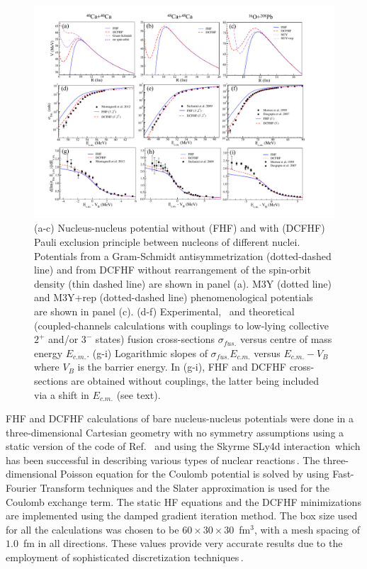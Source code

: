 \begin{figure}
	\includegraphics*[width=\textwidth]{../Figures/Pauli/Vb_cs.pdf}
	\caption{ (a-c) Nucleus-nucleus potential without (FHF) and with (DCFHF) 
		Pauli exclusion principle between nucleons of different nuclei. Potentials  from a 
		Gram-Schmidt antisymmetrization (dotted-dashed line) and from DCFHF without 
		rearrangement of the spin-orbit density (thin dashed line) are  shown in panel (a). 
		M3Y (dotted line) and M3Y+rep (dotted-dashed line) phenomenological potentials~\protect\citep{esbensen2007}  are shown in panel (c). (d-f) 
		Experimental,~\protect\citep{morton1999,dasgupta2007,montagnoli2012,stefanini2009} and theoretical 
		(coupled-channels calculations with couplings to low-lying collective $2^+$ and/or 
		$3^-$ states) fusion cross-sections $\sigma_{fus.}$ versus centre of mass energy 
		$E_{c.m.}$. (g-i)  Logarithmic slopes of $\sigma_{fus.}E_{c.m.}$ versus $E_{c.m.}-V_B$ 
		where $V_B$ is the barrier energy. In (g-i), FHF and DCFHF cross-sections are obtained
		without couplings, the latter being included via a shift in $E_{c.m.}$ (see text).}
	\label{fig:Vb_cs}
\end{figure}

FHF and DCFHF calculations of bare nucleus-nucleus potentials were done in a three-dimensional
Cartesian geometry with no symmetry assumptions using a static version 
of the code of Ref.~\citep{umar2006c} and using the
Skyrme SLy4d interaction\,\citep{kim1997} which has been successful in 
describing various types of nuclear reactions\,\citep{simenel2012}.
The three-dimensional Poisson equation for the Coulomb potential
is solved by using Fast-Fourier Transform techniques
and the Slater approximation is used for the Coulomb exchange term.
The static HF equations and the DCFHF
minimizations are implemented using the damped gradient
iteration method. The box size used for all the calculations
was chosen to be $60\times 30\times 30$~fm$^3$, with a mesh spacing of
$1.0$~fm in all directions. 
These values provide very accurate results due to the employment 
of sophisticated discretization techniques\,\citep{umar1991a,umar1991b}.

